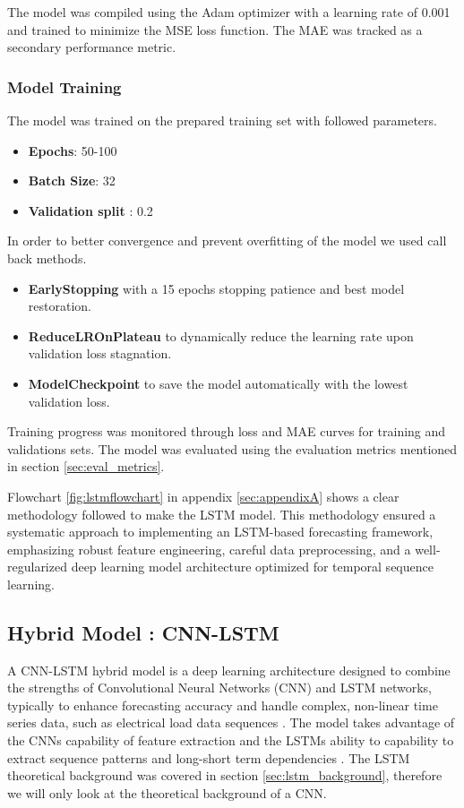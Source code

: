  The model was compiled using the Adam optimizer with a learning rate of 0.001 and trained to minimize the MSE loss function. The MAE was tracked as a secondary performance metric.
 
 \subsubsection{Model Training}The model was trained on the prepared training set with followed parameters.
 {\small
 \begin{itemize}
 	\item \textbf{Epochs}:  50-100
 	\item \textbf{Batch Size}:  32
 	\item\textbf{Validation split} : 0.2
 	\end{itemize}
 }
 	In order to better convergence and prevent overfitting of the model we used call back methods. 
 {\small
 		\begin{itemize}
 		\item \textbf{EarlyStopping} with a  15 epochs stopping patience and best model restoration.
 		\item \textbf{ReduceLROnPlateau} to dynamically reduce the learning rate upon validation loss stagnation.
 		\item \textbf{ModelCheckpoint} to save the model automatically with the lowest validation loss.
 	\end{itemize} }
 Training progress was monitored through loss and MAE curves for training and validations sets. The model was evaluated using the evaluation metrics mentioned in section \ref{sec:eval_metrics}.
 	
Flowchart \ref{fig:lstmflowchart} in appendix \ref{sec:appendixA} shows a clear methodology followed to make the LSTM model. This methodology ensured a systematic approach to implementing an LSTM-based forecasting framework, emphasizing robust feature engineering, careful data preprocessing, and a well-regularized deep learning model architecture optimized for temporal sequence learning.


\subsection{Hybrid Model : CNN-LSTM }
A CNN-LSTM hybrid model is a deep learning architecture designed to combine the strengths of Convolutional Neural Networks (CNN) and LSTM networks, typically to enhance forecasting accuracy and handle complex, non-linear time series data, such as electrical load data sequences \cite{zhu2025novel}. The model takes advantage of the CNNs capability of feature extraction and the LSTMs ability to capability to extract sequence patterns and long-short term dependencies \cite{alhussein2020hybrid}. The LSTM theoretical background was covered in section \ref{sec:lstm_background}, therefore we will only look at the theoretical background of a CNN.

